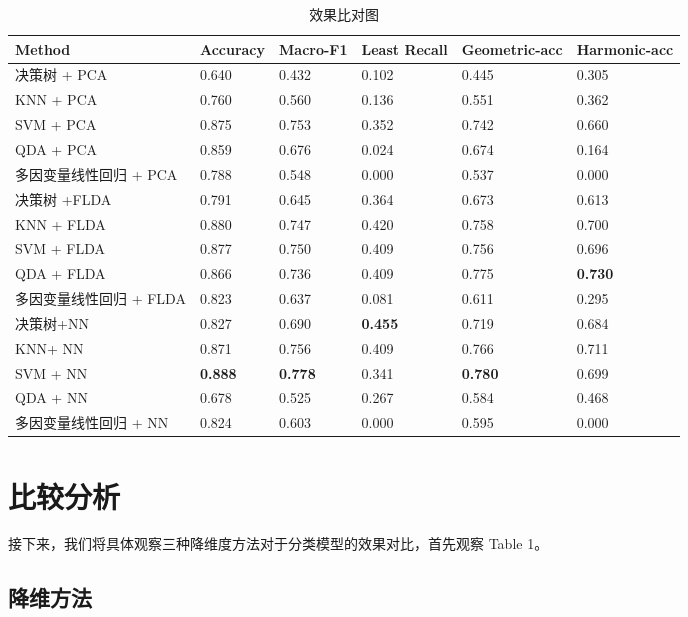 \documentclass[fleqn]{Paquetes/RevDigMatEduInt}
\begin{document}
\begin{table*}[ht!!!]
	\centering
	\vspace{0pt}
	\begin{tabular}{*6l}    \toprule
		Method & Accuracy & Macro-F1 & Least Recall&Geometric-acc & Harmonic-acc \\ \midrule
		决策树 + PCA&0.640&0.432&0.102 &0.445&0.305\\
		KNN + PCA & 0.760 & 0.560 & 0.136 & 0.551 & 0.362\\
		SVM + PCA & 0.875 & 0.753 & 0.352 & 0.742 & 0.660\\
		QDA + PCA & 0.859 & 0.676 & 0.024 & 0.674 & 0.164\\
		多因变量线性回归 + PCA&0.788&0.548&0.000&0.537&0.000\\
		\midrule
		决策树 +FLDA & 0.791 & 0.645 & 0.364 & 0.673 & 0.613\\
		KNN + FLDA &{0.880} & 0.747 & {0.420} & 0.758 & 0.700\\
		SVM + FLDA & 0.877 & 0.750 & {0.409} & 0.756 & 0.696\\
		QDA + FLDA &0.866 & 0.736 & 0.409 & {0.775} & \textcolor{azulTitulos}{\textbf{0.730}} \\
		多因变量线性回归 + FLDA &0.823 & 0.637 & 0.081 & 0.611 & 0.295 \\
		\midrule
		决策树+NN&0.827 & 0.690 &\textcolor{azulTitulos}{\textbf{ 0.455}} & 0.719 & 0.684\\
		KNN+ NN&0.871 & {0.756} & 0.409 & 0.766 & 0.711\\
		SVM + NN&\textcolor{azulTitulos}{\textbf{0.888}} & \textcolor{azulTitulos}{\textbf{0.778}} & 0.341 & \textcolor{azulTitulos}{\textbf{0.780}} & 0.699\\
		QDA + NN&0.678 & 0.525 & 0.267 & 0.584 & 0.468\\
		多因变量线性回归 + NN&0.824 & 0.603 & 0.000 & 0.595 & 0.000\\
		\bottomrule
	\end{tabular}
	\caption{效果比对图}
\end{table*}

\section{比较分析}
接下来，我们将具体观察三种降维度方法对于分类模型的效果对比，首先观察 Table 1。

\subsection{降维方法}
\end{document}
